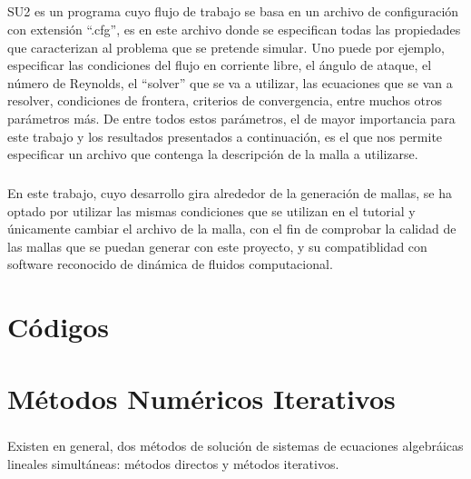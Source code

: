 \documentclass[letterpaper, openright, 12pt]{book}
\begin{document}
    \paragraph*{}
    SU2 es un programa cuyo flujo de trabajo se basa en un archivo de
    configuración con extensión ``.cfg'', es en este archivo donde se
    especifican todas las propiedades que caracterizan al problema que se
    pretende simular. Uno puede por ejemplo, especificar las condiciones del
    flujo en corriente libre, el ángulo de ataque, el número de Reynolds, el
    ``solver'' que se va a utilizar, las ecuaciones que se van a resolver,
    condiciones de frontera, criterios de convergencia, entre muchos otros
    parámetros más. De entre todos estos parámetros, el de mayor importancia
    para este trabajo y los resultados presentados a continuación, es el que nos
    permite especificar un archivo que contenga la descripción de la malla a
    utilizarse.

    \paragraph*{}
    En este trabajo, cuyo desarrollo gira alrededor de la generación de mallas,
    se ha optado por utilizar las mismas condiciones que se utilizan en el
    tutorial y únicamente cambiar el archivo de la malla, con el fin de
    comprobar la calidad de las mallas que se puedan generar con este proyecto,
    y su compatiblidad con software reconocido de dinámica de fluidos computacional.

%
%
%
%
%

%
%
%
%
%
\appendix
\chapter{Códigos}\label{appCode}

%
%
%
%
%

%
%
%
%
%
\chapter{Métodos Numéricos Iterativos}\label{appIter}
    \paragraph*{}
        Existen en general, dos métodos de solución de sistemas de ecuaciones
        algebráicas lineales simultáneas: métodos directos y métodos iterativos.
\end{document}
